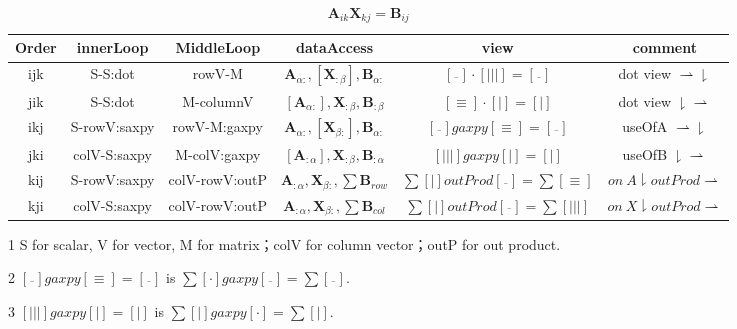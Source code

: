 \documentclass[UTF8]{../../09-Mathematics}
\begin{document}
\begin{table}[htbp]
    \newcommand{\tabincell}[2]{\begin{tabular}{@{}#1@{}}#2\end
    {tabular}}
    \centering
    \begin{threeparttable}
    \caption{$\boldsymbol A_{ik} \boldsymbol X_{kj} = \boldsymbol B_{ij}$ }
    \label{tab:label}
    \begin{tabular}{cccccc}
        \toprule
        Order & innerLoop & MiddleLoop & dataAccess & view & comment\\
        \midrule
        ijk & S-S:dot & rowV-M 
        & $\boldsymbol A_{\alpha:},[\boldsymbol X_{:\beta}], \boldsymbol B_{\alpha:} $ 
        & $ [\overline{\ \ } ] \cdot [|||] =  [\overline{\ \ } ]$
        & dot view $\rightharpoonup \downharpoonright$ \\

        jik & S-S:dot & M-columnV
        & $[\boldsymbol A_{\alpha:}],\boldsymbol X_{:\beta}, \boldsymbol B_{:\beta} $ 
        & $ [\equiv ] \cdot [|]=  [|]$
        & dot view $ \downharpoonright \rightharpoonup$\\

        ikj & S-rowV:saxpy & rowV-M:gaxpy
        & $\boldsymbol A_{\alpha:},[\boldsymbol X_{\beta:}], \boldsymbol B_{\alpha:} $ 
        & $[\overline{\ \ } ] gaxpy [\equiv ] = [\overline{\ \ } ]$
        & useOfA $\rightharpoonup \downharpoonright$\\

        jki & colV-S:saxpy & M-colV:gaxpy
        & $[\boldsymbol A_{:\alpha}],\boldsymbol X_{:\beta}, \boldsymbol B_{:\alpha} $ 
        & $[||| ] gaxpy [| ] = [| ]$
        & useOfB $ \downharpoonright \rightharpoonup$\\

        kij& S-rowV:saxpy & colV-rowV:outP
        & $\boldsymbol A_{:\alpha},\boldsymbol X_{\beta:},\sum \boldsymbol B_{row} $ 
        & $\sum[| ] outProd [\overline{\ \ } ] =\sum[\equiv ]$
        & $ on \  A \downharpoonright outProd \rightharpoonup$\\

        kji& colV-S:saxpy & colV-rowV:outP
        & $\boldsymbol A_{:\alpha},\boldsymbol X_{\beta:},\sum \boldsymbol B_{col} $ 
        & $\sum[| ] outProd [\overline{\ \ } ] =\sum[||| ]$
        & $on \  X  \downharpoonright outProd \rightharpoonup$\\
        \bottomrule
    \end{tabular}
    \begin{tablenotes}
        \item[1] S for scalar, V for vector, M for matrix；colV for column vector；outP for out product.
        \item[2] $[\overline{\ \ } ] gaxpy [\equiv ] = [\overline{\ \ } ]$ is 
$\sum[\cdot] gaxpy [\overline{\ \ } ] = \sum[\overline{\ \ }]$.
        \item[3] $[||| ] gaxpy [| ] = [| ]$ is $\sum[| ] gaxpy [\cdot] = \sum[| ]$.
      \end{tablenotes}
    \end{threeparttable}
\end{table}
\end{document}
